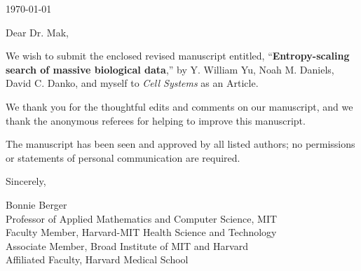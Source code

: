 \documentclass{article}
\begin{document}
\hspace*{0.5\linewidth}

\today

\bigskip

Dear Dr. Mak,

We wish to submit the enclosed revised manuscript entitled,
``\textbf{Entropy-scaling search of massive biological data},''
by Y. William Yu, Noah M. Daniels, David C. Danko, and myself
to \textit{Cell Systems} as an Article.

We thank you for the thoughtful edits and comments on our manuscript, and we thank the anonymous referees for helping to improve this manuscript.

The manuscript has been seen and approved by all listed authors; no permissions or statements of personal communication are required.

Sincerely,

Bonnie Berger  \\
Professor of Applied Mathematics and Computer Science, MIT  \\
Faculty Member, Harvard-MIT Health Science and Technology\\
Associate Member, Broad Institute of MIT and Harvard \\
Affiliated Faculty, Harvard Medical School
\end{document}
